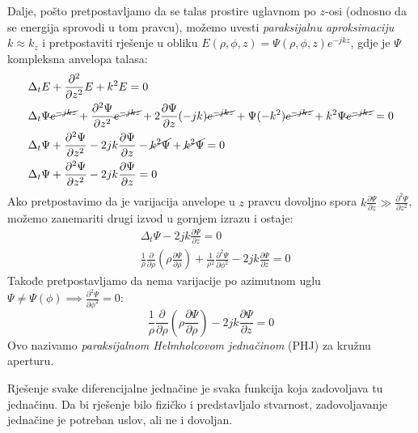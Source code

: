 \documentclass[fleqn]{report}
\begin{document}
Dalje, pošto pretpostavljamo da se talas prostire uglavnom po $z$-osi (odnosno da se energija sprovodi u tom pravcu), možemo uvesti \emph{paraksijalnu aproksimaciju} $k \approx k_z$ i pretpostaviti rješenje u obliku $E(\rho, \phi, z) = \Psi(\rho, \phi, z) e^{-jkz}$, gdje je $\Psi$ kompleksna anvelopa talasa:
\begin{align*}
     & \Delta_t E + \frac{\partial^2}{\partial z^2}E + k^2 E = 0                                                                                                                                                        \\
     & \Delta_t\Psi \cancel{e^{-jkz}} + \frac{\partial^2\Psi}{\partial z^2} \cancel{e^{-jkz}} + 2 \frac{\partial\Psi}{\partial z} (-jk) \cancel{e^{-jkz}} + \Psi(-k^2)\cancel{e^{-jkz}} + k^2\Psi \cancel{e^{-jkz}} = 0 \\
     & \Delta_t\Psi + \frac{\partial^2\Psi}{\partial z^2} - 2jk \frac{\partial\Psi}{\partial z} - \cancel{k^2\Psi} + \cancel{k^2\Psi} = 0                                                                               \\
     & \Delta_t\Psi + \frac{\partial^2\Psi}{\partial z^2} - 2jk \frac{\partial\Psi}{\partial z} = 0
\end{align*}
Ako pretpostavimo da je varijacija anvelope u $z$ pravcu dovoljno spora $k\frac{\partial\Psi}{\partial z} \gg \frac{\partial^2\Psi}{\partial z^2}$, možemo zanemariti drugi izvod u gornjem izrazu i ostaje:
\begin{align}
     & \Delta_t\Psi - 2jk\frac{\partial\Psi}{\partial z} = 0 \label{gs - phj}                                                                                                                                       \\
     & \frac{1}{\rho}\frac{\partial}{\partial \rho} \left( \rho\frac{\partial\Psi}{\partial\rho} \right) + \frac{1}{\rho^2}\frac{\partial^2\Psi}{\partial\phi^2} - 2jk\frac{\partial\Psi}{\partial z} = 0 \nonumber
\end{align}
Takođe pretpostavljamo da nema varijacije po azimutnom uglu $\Psi \neq \Psi(\phi) \implies \frac{\partial^2\Psi}{\partial\phi^2} = 0$:
\begin{equation*}
    \frac{1}{\rho}\frac{\partial}{\partial\rho} \left( \rho\frac{\partial\Psi}{\partial\rho}\right) - 2jk\frac{\partial\Psi}{\partial z} = 0
\end{equation*}
Ovo nazivamo \emph{paraksijalnom Helmholcovom jednačinom} (PHJ) za kružnu aperturu.

Rješenje svake diferencijalne jednačine je svaka funkcija koja zadovoljava tu jednačinu.
Da bi rješenje bilo fizičko i predstavljalo stvarnost, zadovoljavanje jednačine je potreban uslov, ali ne i dovoljan.
\end{document}
